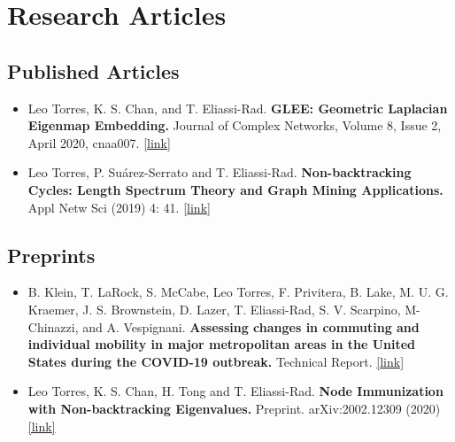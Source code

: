 \documentclass[12pt,]{scrartcl}
\date{}
\begin{document}
\section{Research Articles}\label{publications}

\subsection{Published Articles}\label{articles}

\begin{itemize}
\leftskip-0.25in %

\item Leo Torres, K. S. Chan, and T. Eliassi-Rad. \textbf{GLEE: Geometric Laplacian Eigenmap Embedding.} Journal of Complex Networks, Volume 8, Issue 2, April 2020, cnaa007. \href{https://academic.oup.com/comnet/article/8/2/cnaa007/5775302?guestAccessKey=a6a1e399-bc7d-48db-82ad-5a3beabd81bf}{[link]} 

\item Leo Torres, P. Su\'arez-Serrato and T. Eliassi-Rad.  \textbf{Non-backtracking Cycles: Length Spectrum Theory and Graph Mining Applications.}  Appl Netw Sci (2019) 4: 41. \href{https://doi.org/10.1007/s41109-019-0147-y}{[link]}

\end{itemize}


\subsection{Preprints}\label{preprints}

\begin{itemize}
\leftskip-0.25in %

\item B. Klein, T. LaRock, S. McCabe, Leo Torres, F. Privitera, B. Lake, M. U. G. Kraemer, J. S. Brownstein, D. Lazer, T. Eliassi-Rad, S. V. Scarpino, M- Chinazzi, and A. Vespignani. \textbf{Assessing changes in commuting and individual mobility in major metropolitan areas in the United States during the COVID-19 outbreak.} Technical Report. \href{https://www.mobs-lab.org/uploads/6/7/8/7/6787877/assessing_mobility_changes_in_the_united_states_during_the_covid_19_outbreak.pdf}{[link]}

\item Leo Torres, K. S. Chan, H. Tong and T. Eliassi-Rad. \textbf{Node Immunization with Non-backtracking Eigenvalues.} Preprint. arXiv:2002.12309 (2020) \href{https://arxiv.org/abs/2002.12309}{[link]}

\end{itemize}
\end{document}
